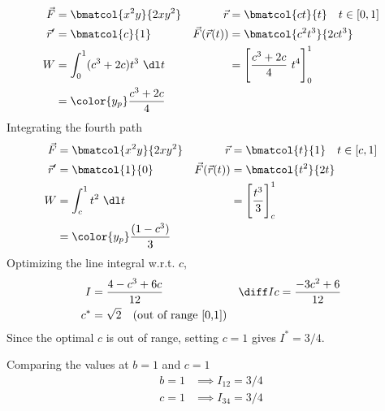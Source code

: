 \begin{enumerate}
\begin{enumerate}
                    \begin{align}
                        \vec{F}             & = \bmatcol{x^2y}{2xy^2}              &
                        \vec{r}             & = \bmatcol{ct}{t} \quad t \in [0, 1]   \\
                        \vec{r}'            & = \bmatcol{c}{1}                     &
                        \vec{F}(\vec{r}(t)) & = \bmatcol{c^2t^3}{2ct^3}              \\
                        W                   & = \int_{0}^{1}(c^3 + 2c)t^3\ \dl t   &
                                            & = \Bigg[\frac{c^3 + 2c}{4}\ t^4
                        \Bigg]_0^1                                                   \\
                                            & = \color{y_p} \frac{c^3 + 2c}{4}
                    \end{align}
                    Integrating the fourth path
                    \begin{align}
                        \vec{F}             & = \bmatcol{x^2y}{2xy^2}             &
                        \vec{r}             & = \bmatcol{t}{1} \quad t \in [c, 1]   \\
                        \vec{r}'            & = \bmatcol{1}{0}                    &
                        \vec{F}(\vec{r}(t)) & = \bmatcol{t^2}{2t}                   \\
                        W                   & = \int_{c}^{1} t^2\ \dl t           &
                                            & = \Bigg[ \frac{t^3}{3}
                        \Bigg]_c^1                                                  \\
                                            & = \color{y_p} \frac{(1 - c^3)}{3}
                    \end{align}
                    Optimizing the line integral w.r.t. $ c $,
                    \begin{align}
                        I        & = \frac{4 - c^3 + 6c}{12}                    &
                        \diff Ic & = \frac{-3c^2 + 6}{12}                         \\
                        c^*      & = \sqrt{2} \quad (\text{out of range [0,1]})
                    \end{align}
                    Since the optimal $ c $ is out of range, setting $ c = 1 $ gives
                    $ I^* = 3/4 $. \par
                    Comparing the values at $ b = 1 $ and $ c = 1 $
                    \begin{align}
                        b = 1 & \implies I_{12} = 3/4 \\
                        c = 1 & \implies I_{34} = 3/4
                    \end{align}
          \end{enumerate}


\end{enumerate}
